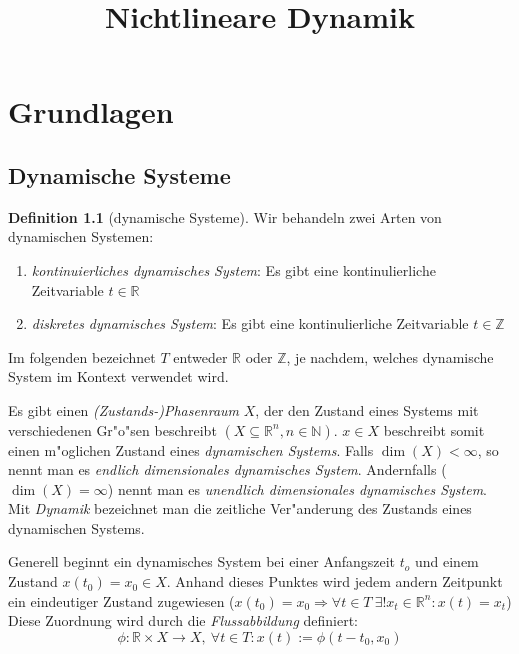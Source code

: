 \documentclass[a4paper, 13pt]{scrreprt}
\theoremstyle{definition} \newtheorem{definition}{Definition}[section]
\begin{document}
\title{Nichtlineare Dynamik}
\publishers{\small{Fehler in der Mitschrift an
\url{alexander.book@gmx.de}} oder 
\url{dominik.o@gmx.net}}
\maketitle
\tableofcontents


\chapter{Grundlagen}
\section{Dynamische Systeme}
\begin{definition}[dynamische Systeme]
Wir behandeln zwei Arten von dynamischen Systemen:
\begin{enumerate}
\item \emph{kontinuierliches dynamisches System}: Es gibt eine kontinulierliche Zeitvariable $t\in\mathbb{R}$
\item \emph{diskretes dynamisches System}: Es gibt eine kontinulierliche Zeitvariable $t\in\mathbb{Z}$
\end{enumerate}
Im folgenden bezeichnet $T$ entweder $\mathbb{R}$ oder $\mathbb{Z}$, je nachdem, welches dynamische System im Kontext verwendet wird.

Es gibt einen \emph{(Zustands-)Phasenraum} $X$, der den Zustand eines Systems mit verschiedenen Gr"o"sen beschreibt $(X\subseteq \mathbb{R}^n, n\in \mathbb{N})$. $x\in X$ beschreibt somit einen m"oglichen Zustand eines \emph{dynamischen Systems}. Falls $\operatorname{dim}(X) < \infty$, so nennt man es \emph{endlich dimensionales dynamisches System}. Andernfalls ($\operatorname{dim}(X) = \infty$) nennt man es \emph{unendlich dimensionales dynamisches System}. Mit \emph{Dynamik} bezeichnet man die zeitliche Ver"anderung des Zustands eines dynamischen Systems.
\end{definition}


Generell beginnt ein dynamisches System bei einer Anfangszeit $t_o$ und einem Zustand $x(t_0) = x_0 \in X$. Anhand dieses Punktes wird jedem andern Zeitpunkt ein eindeutiger Zustand zugewiesen ($x(t_0) = x_0 \Rightarrow \forall t\in T\  \exists! x_t\in\mathbb{R}^n: x(t) = x_t$)
Diese Zuordnung wird durch die \emph{Flussabbildung} definiert:
$$\phi\colon \mathbb{R}\times X\to X, \ \forall t \in T: x(t):= \phi(t-t_0, x_0) $$
\end{document}
